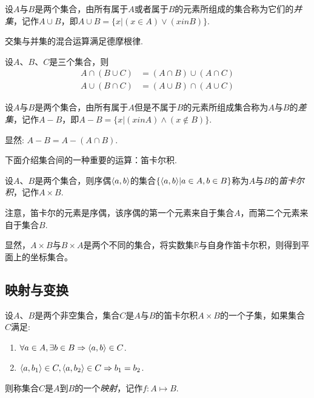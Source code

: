 \begin{definition}
  设$A$与$B$是两个集合，由所有属于$A$或者属于$B$的元素所组成的集合称为它们的\emph{并集}，记作$A \cup B$，即$A \cup B = \{x | (x \in A) \lor (x in B) \}$.
\end{definition}

交集与并集的混合运算满足德摩根律.
\begin{theorem}
  设$A$、$B$、$C$是三个集合，则
  \begin{align*}
    A \cap (B \cup C) & = (A \cap B) \cup (A \cap C) \\
    A \cup (B \cap C) & = (A \cup B) \cap (A \cup C) 
  \end{align*}
\end{theorem}

\begin{definition}
  设$A$与$B$是两个集合，由所有属于$A$但是不属于$B$的元素所组成集合称为$A$与$B$的\emph{差集}，记作$A-B$，即$A-B = \{x | (x in A) \land (x \notin B) \}$.
\end{definition}

显然: $A-B = A - (A \cap B)$.

下面介绍集合间的一种重要的运算：笛卡尔积.
\begin{definition}
  设$A$、$B$是两个集合，则序偶$\langle a, b \rangle$的集合$\{ \langle a, b \rangle | a \in A, b \in B \}$称为$A$与$B$的\emph{笛卡尔积}，记作$A \times B$.
\end{definition}

注意，笛卡尔的元素是序偶，该序偶的第一个元素来自于集合$A$，而第二个元素来自于集合$B$.

显然，$A \times B$与$B \times A$是两个不同的集合，将实数集$\mathbb{R}$与自身作笛卡尔积，则得到平面上的坐标集合。

\subsection{映射与变换}
\label{sec:map-and-translation}

\begin{definition}
  设$A$、$B$是两个非空集合，集合$C$是$A$与$B$的笛卡尔积$A \times B$的一个子集，如果集合$C$满足:
  \begin{enumerate}
  \item $\forall a \in A, \exists  b \in B \Rightarrow \langle a, b \rangle \in C$.
  \item $ \langle a, b_1 \rangle \in C, \langle a, b_2 \rangle \in C \Rightarrow b_1=b_2$.
  \end{enumerate}
  则称集合$C$是$A$到$B$的一个\emph{映射}，记作$f:A \mapsto B$.
\end{definition}

